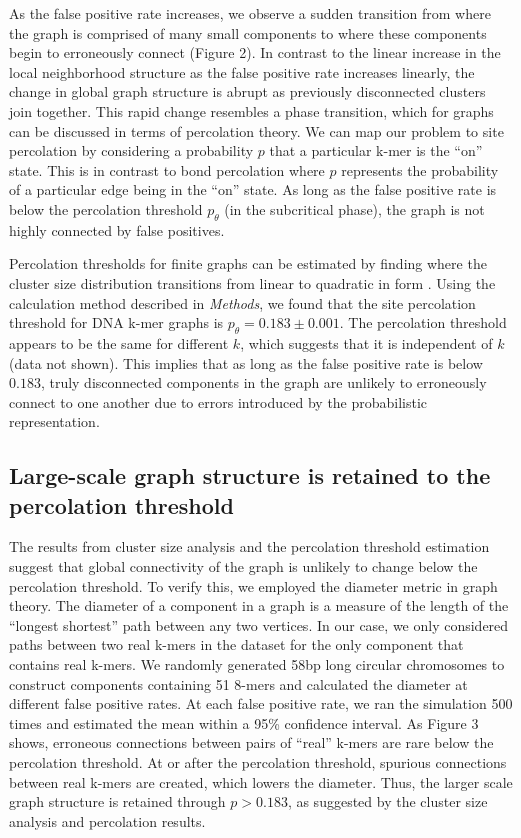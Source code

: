 \documentclass[12pt]{article} \usepackage{simplemargins}
\begin{document}
As the false positive rate increases, we observe a sudden
transition from where the graph is comprised of many small  
components to where these components begin to erroneously connect (Figure 2). 
In contrast to the linear increase in the local neighborhood structure
as the false positive rate increases linearly, 
the change in global graph structure is abrupt as previously disconnected 
clusters join together.  
This rapid change resembles a phase transition, which for graphs
can be 
discussed in terms of percolation theory. We can map 
our problem to site percolation by considering a probability $p$ that a 
particular k-mer is the ``on'' state. This is in contrast to bond percolation where 
$p$ represents the probability of a particular edge being in the ``on'' state. As
long as the false positive rate is below the percolation threshold $p_\theta$ (in
the subcritical phase), the graph is not highly connected by false positives.


Percolation thresholds for finite graphs can be estimated by
finding where the cluster size distribution transitions from linear to
quadratic in form \cite{stauffer1979scaling}.  Using the calculation method described
in \emph{Methods}, we found that the site percolation threshold for
DNA k-mer graphs is $p_\theta = 0.183 \pm 0.001$.  The percolation
threshold appears to be the same for different $k$, which suggests
that it is independent of $k$ (data not shown). This implies that as long as
the false positive rate is below $0.183$, truly disconnected components in the
graph are unlikely to erroneously connect to one another due to errors
introduced by the probabilistic representation.

\subsection{Large-scale graph structure is retained to the percolation threshold}
The results from cluster size analysis and the percolation threshold 
estimation suggest that 
global connectivity of the graph is unlikely 
to change below the percolation threshold. To verify this, we employed 
the diameter metric in graph theory.  
The diameter of a component in a graph is a measure of 
the length of the ``longest shortest'' 
path between any two vertices\cite{bondy2008graph}.
In our case, we only considered paths between two real k-mers
in the dataset for the only component that contains real k-mers. 
We randomly generated 58bp long circular
chromosomes to construct components containing 51 8-mers and 
calculated the diameter at different false positive rates. At each 
false positive rate, we ran the 
simulation 500 times and estimated the mean within a 95\% 
confidence interval. As Figure 3 shows, 
erroneous connections between pairs of ``real'' k-mers are rare
below the 
percolation threshold. At or after the percolation threshold, spurious connections 
between real k-mers are created, which lowers the diameter. 
Thus, the larger scale graph structure is retained through $p > 0.183$, as suggested by the cluster size analysis and percolation results.
\end{document}
